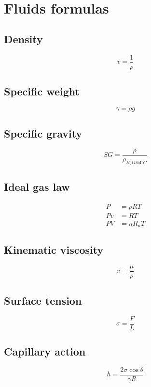 \documentclass[class=report, crop=false, 12pt,a4paper]{standalone}
\begin{document}
\section{Fluids formulas}
\subsection{Density}
\begin{equation*}
  v = \frac{1}{\rho}
\end{equation*}
\subsection{Specific weight}
\begin{equation*}
  \gamma = \rho g
\end{equation*}
\subsection{Specific gravity}
\begin{equation*}
  SG = \frac{\rho}{\rho_{H_2O @ 4\si{\degree}C}}
\end{equation*}
\subsection{Ideal gas law}
\begin{align*}
  P &= \rho R T\\
  Pv &= RT\\
  PV &= n R_u T
\end{align*}
\subsection{Kinematic viscosity}
\begin{equation*}
  v = \frac{\mu}{\rho}
\end{equation*}
\subsection{Surface tension}
\begin{equation*}
  \sigma = \frac{F}{L}
\end{equation*}
\subsection{Capillary action}
\begin{equation*}
  h = \frac{2 \sigma \cos \theta}{\gamma R}
\end{equation*}
\end{document}
